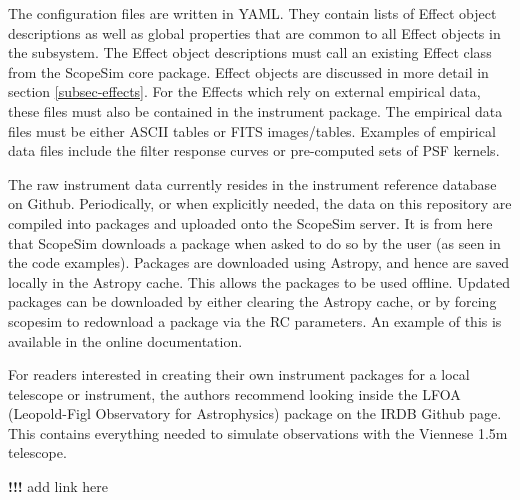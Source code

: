 The configuration files are written in YAML.
They contain lists of Effect object descriptions as well as global properties that are common to all Effect objects in the subsystem.
The Effect object descriptions must call an existing Effect class from the ScopeSim core package.
Effect objects are discussed in more detail in section \ref{subsec-effects}.
For the Effects which rely on external empirical data, these files must also be contained in the instrument package.
The empirical data files must be either ASCII tables or FITS images/tables.
Examples of empirical data files include the filter response curves or pre-computed sets of PSF kernels.

The raw instrument data currently resides in the instrument reference database on Github.
Periodically, or when explicitly needed, the data on this repository are compiled into packages and uploaded onto the ScopeSim server.
It is from here that ScopeSim downloads a package when asked to do so by the user (as seen in the code examples).
Packages are downloaded using Astropy, and hence are saved locally in the Astropy cache.
This allows the packages to be used offline.
Updated packages can be downloaded by either clearing the Astropy cache, or by forcing scopesim to redownload a package via the RC parameters.
An example of this is available in the online documentation.

For readers interested in creating their own instrument packages for a local telescope or instrument, the authors recommend looking inside the LFOA (Leopold-Figl Observatory for Astrophysics) package on the IRDB Github page.
This contains everything needed to simulate observations with the Viennese 1.5m telescope.

\textbf{!!!} add link here
